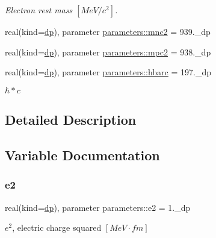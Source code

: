 \begin{DoxyCompactItemize}
\begin{DoxyCompactList}\small\item\em Electron rest mass $[MeV/c^2]$. \end{DoxyCompactList}\item 
real(kind=\mbox{\hyperlink{namespaceparameters_a52f8c6351fd79345d8811e065bcbbb37}{dp}}), parameter \mbox{\hyperlink{group__CONSTANTS_ga3cd51d33e13930045ff98294b5044e2c}{parameters\+::mnc2}} = 939.\+\_\+dp
\item 
real(kind=\mbox{\hyperlink{namespaceparameters_a52f8c6351fd79345d8811e065bcbbb37}{dp}}), parameter \mbox{\hyperlink{group__CONSTANTS_ga2e354d662a28a3a09a9819c54f818dab}{parameters\+::mpc2}} = 938.\+\_\+dp
\item 
real(kind=\mbox{\hyperlink{namespaceparameters_a52f8c6351fd79345d8811e065bcbbb37}{dp}}), parameter \mbox{\hyperlink{group__CONSTANTS_gafb47622609b676d956b2c58f4b909064}{parameters\+::hbarc}} = 197.\+\_\+dp
\begin{DoxyCompactList}\small\item\em $\hbar*c$ \end{DoxyCompactList}\end{DoxyCompactItemize}


\subsection{Detailed Description}


\subsection{Variable Documentation}
\mbox{\label{group__CONSTANTS_gaafa6a6262bc00c89fb3d403241497d22}} 
\subsubsection{\texorpdfstring{e2}{e2}}
{\footnotesize\ttfamily real(kind=\mbox{\hyperlink{namespaceparameters_a52f8c6351fd79345d8811e065bcbbb37}{dp}}), parameter parameters\+::e2 = 1.\+\_\+dp}



$e^2$, electric charge squared $[MeV\cdot fm]$ 

\mbox{\label{group__CONSTANTS_gad4b06975615fad2c991376a975fd08f1}} 
